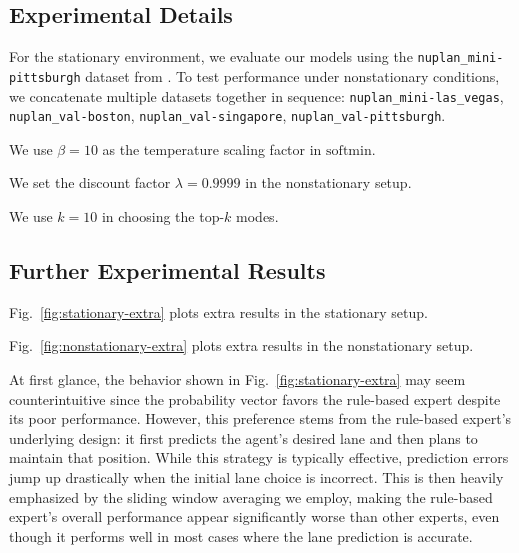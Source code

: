 \subsection{Experimental Details}
For the stationary environment, we evaluate our models using the \texttt{nuplan_mini-pittsburgh} dataset from \nuscenes. To test performance under nonstationary conditions, we concatenate multiple datasets together in sequence: \texttt{nuplan_mini-las_vegas}, \texttt{nuplan_val-boston}, \texttt{nuplan_val-singapore}, \texttt{nuplan_val-pittsburgh}.

We use $\beta=10$ as the temperature scaling factor in $\mathrm{softmin}$.

We set the discount factor $\lambda=0.9999$ in the nonstationary setup.

We use $k=10$ in choosing the top-$k$ modes.



\subsection{Further Experimental Results}
\label{app:experiments}

Fig.~\ref{fig:stationary-extra} plots extra results in the stationary setup.

Fig.~\ref{fig:nonstationary-extra} plots extra results in the nonstationary setup.

At first glance, the behavior shown in Fig.~\ref{fig:stationary-extra} may seem counterintuitive since the probability vector favors the rule-based expert despite its poor performance. However, this preference stems from the rule-based expert's underlying design: it first predicts the agent's desired lane and then plans to maintain that position. While this strategy is typically effective, prediction errors jump up drastically when the initial lane choice is incorrect. This is then heavily emphasized by the sliding window averaging we employ, making the rule-based expert's overall performance appear significantly worse than other experts, even though it performs well in most cases where the lane prediction is accurate.

